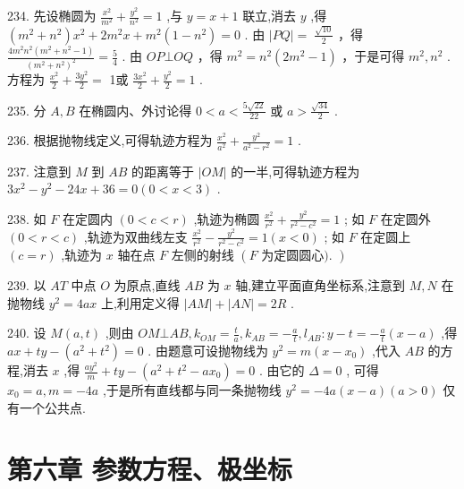 \documentclass[10pt]{article}
\begin{document}
234. 先设椭圆为 \(\frac{{x}^{2}}{{m}^{2}} + \frac{{y}^{2}}{{n}^{2}} = 1\) ,与 \(y = x + 1\) 联立,消去 \(y\) ,得 \(\left( {{m}^{2} + {n}^{2}}\right) {x}^{2} + 2{m}^{2}x + {m}^{2}\left( {1 - {n}^{2}}\right)  = 0\) . 由 \(\left| {PQ}\right|  = \; \frac{\sqrt{10}}{2}\) ，得 \(\frac{4{m}^{2}{n}^{2}\left( {{m}^{2} + {n}^{2} - 1}\right) }{{\left( {m}^{2} + {n}^{2}\right) }^{2}} = \frac{5}{4}\) . 由 \({OP}\bot {OQ}\) ，得 \({m}^{2} = {n}^{2}\left( {2{m}^{2} - 1}\right)\) ，于是可得 \({m}^{2},{n}^{2}\) . 方程为 \(\frac{{x}^{2}}{2} + \frac{3{y}^{2}}{2} =\) 1或 \(\frac{3{x}^{2}}{2} + \frac{{y}^{2}}{2} = 1\) .

235. 分 \(A,B\) 在椭圆内、外讨论得 \(0 < a < \frac{5\sqrt{22}}{22}\) 或 \(a > \frac{\sqrt{34}}{2}\) .

236. 根据抛物线定义,可得轨迹方程为 \(\frac{{x}^{2}}{{a}^{2}} + \frac{{y}^{2}}{{a}^{2} - {r}^{2}} = 1\) .

237. 注意到 \(M\) 到 \({AB}\) 的距离等于 \(\left| {OM}\right|\) 的一半,可得轨迹方程为 \(3{x}^{2} - {y}^{2} - {24x} + {36} = 0\left( {0 < x < 3}\right)\) .

238. 如 \(F\) 在定圆内 \(\left( {0 < c < r}\right)\) ,轨迹为椭圆 \(\frac{{x}^{2}}{{r}^{2}} + \frac{{y}^{2}}{{r}^{2} - {c}^{2}} = 1\) ; 如 \(F\) 在定圆外 \(\left( {0 < r < c}\right)\) ,轨迹为双曲线左支 \(\frac{{x}^{2}}{{r}^{2}} - \frac{{y}^{2}}{{r}^{2} - {c}^{2}} = 1\left( {x < 0}\right)\) ; 如 \(F\) 在定圆上 \(\left( {c = r}\right)\) ,轨迹为 \(x\) 轴在点 \(F\) 左侧的射线 \(\left( {F\text{ 为定圆圆心). }}\right)\)

239. 以 \({AT}\) 中点 \(O\) 为原点,直线 \({AB}\) 为 \(x\) 轴,建立平面直角坐标系,注意到 \(M,N\) 在抛物线 \({y}^{2} = {4ax}\) 上,利用定义得 \(\left| {AM}\right|  + \left| {AN}\right|  = {2R}\) .

240. 设 \(M\left( {a,t}\right)\) ,则由 \({OM} \bot  {AB},{k}_{OM} = \frac{t}{a},{k}_{AB} =  - \frac{a}{t},{l}_{AB} : y - t =  - \frac{a}{t}\left( {x - a}\right)\) ,得 \({ax} + {ty} - \left( {{a}^{2} + {t}^{2}}\right)  = 0\) . 由题意可设抛物线为 \({y}^{2} = m\left( {x - {x}_{0}}\right)\) ,代入 \({AB}\) 的方程,消去 \(x\) ,得 \(\frac{a{y}^{2}}{m} + {ty} - \left( {{a}^{2} + {t}^{2} - a{x}_{0}}\right)  = 0\) . 由它的 \(\Delta  = 0\) , 可得 \({x}_{0} = a,m =  - {4a}\) ,于是所有直线都与同一条抛物线 \({y}^{2} =  - {4a}\left( {x - a}\right) \left( {a > 0}\right)\) 仅有一个公共点.

\section*{第六章 参数方程、极坐标}
\end{document}

